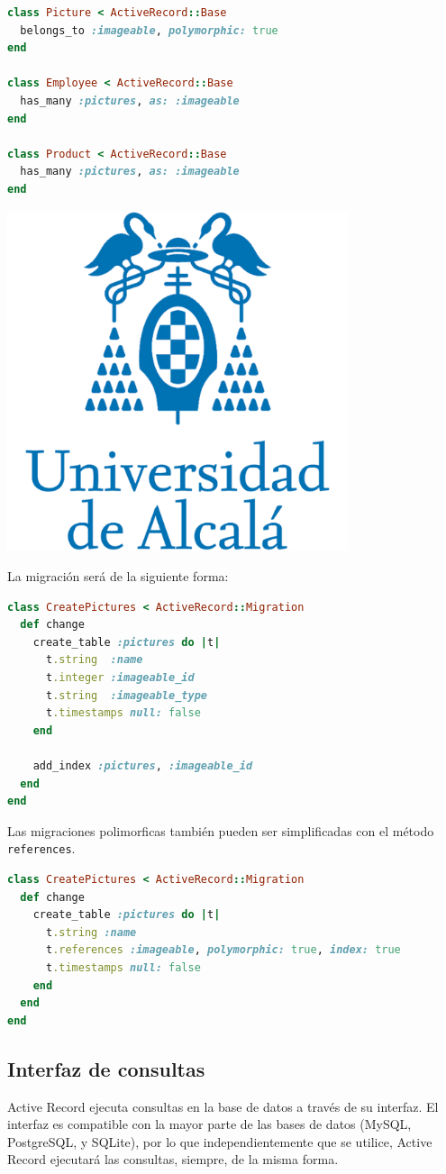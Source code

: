 \begin{lstlisting}[language=Ruby]
class Picture < ActiveRecord::Base
  belongs_to :imageable, polymorphic: true
end
 
class Employee < ActiveRecord::Base
  has_many :pictures, as: :imageable
end
 
class Product < ActiveRecord::Base
  has_many :pictures, as: :imageable
end
\end{lstlisting}

\includegraphics[width=10cm]{./image/logos/uahlogo3.png}

La migración será de la siguiente forma:

\begin{lstlisting}[language=Ruby]
class CreatePictures < ActiveRecord::Migration
  def change
    create_table :pictures do |t|
      t.string  :name
      t.integer :imageable_id
      t.string  :imageable_type
      t.timestamps null: false
    end
 
    add_index :pictures, :imageable_id
  end
end
\end{lstlisting}

Las migraciones polimorficas también pueden ser simplificadas con el método \texttt{references}.

\begin{lstlisting}[language=Ruby]
class CreatePictures < ActiveRecord::Migration
  def change
    create_table :pictures do |t|
      t.string :name
      t.references :imageable, polymorphic: true, index: true
      t.timestamps null: false
    end
  end
end
\end{lstlisting}



\subsection{Interfaz de consultas}
Active Record ejecuta consultas en la base de datos a través de su interfaz. El interfaz es compatible con la mayor parte de las bases de datos (MySQL, PostgreSQL, y SQLite), por lo que independientemente que se utilice, Active Record ejecutará las consultas, siempre, de la misma forma.

